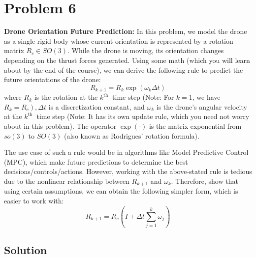 \section*{Problem 6}

\textbf{Drone Orientation Future Prediction:}
In this problem, we model the drone as a single rigid body whose current orientation is represented by a rotation matrix \(R_{c} \in S O(3)\).
While the drone is moving, its orientation changes depending on the thrust forces generated.
Using some math (which you will learn about by the end of the course), we can derive the following rule to predict the future orientations of the drone:
\begin{equation*}
    R_{k+1}=R_{k} \exp \left(\omega_{k} \Delta t\right)
\end{equation*}
where \(R_{k}\) is the rotation at the \(k^{\text {th }}\) time step
(Note: For \(k=1\), we have \(\left.R_{k}=R_{c}\right), \Delta t\)
is a discretization constant, and \(\omega_{k}\) is the drone's angular velocity at the \(k^{\text {th }}\) time step
(Note: It has its own update rule, which you need not worry about in this problem).
The operator \(\exp (\cdot)\) is the matrix exponential from \(s o(3)\) to \(S O(3)\) (also known as Rodrigues' rotation formula).

The use case of such a rule would be in algorithms like Model Predictive Control (MPC), which make future predictions to determine the best decisions/controls/actions.
However, working with the above-stated rule is tedious due to the nonlinear relationship between \(R_{k+1}\) and \(\omega_{k}\).
Therefore, show that using certain assumptions, we can obtain the following simpler form, which is easier to work with:
\begin{equation*}
    R_{k+1}=R_{c}\left(I+\Delta t \sum_{j=1}^{k} \omega_{j}\right)
\end{equation*}

\subsection*{Solution}

